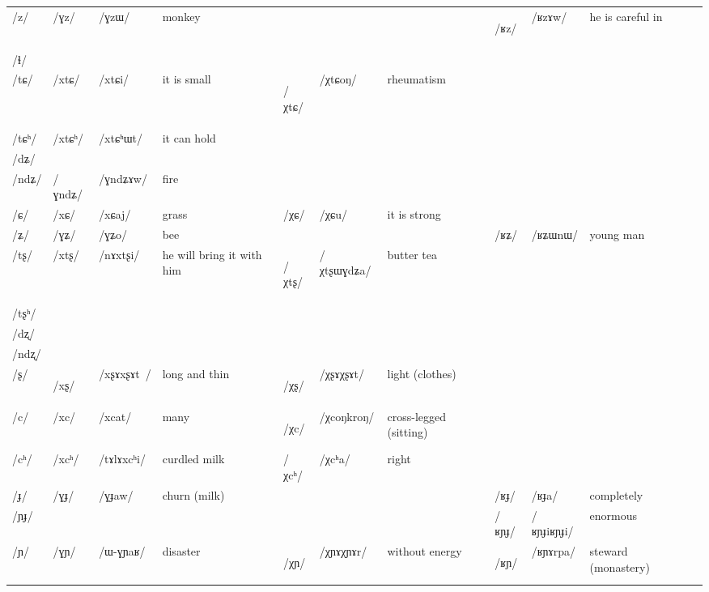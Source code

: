 \documentclass[oneside,a4paper,11pt]{article}
\newcommand{\ipa}[1]{\mbox{\phon/#1/}}
\newcommand{\deux}[1]{\ipa{#1}\addtocounter{2clusters}{1}}
\newcommand{\tib}[1]{\cellcolor{lightgray}\textbf{#1}}
\newcommand{\idph}[1]{\cellcolor{gray}\textbf{#1}}
\begin{document}
\begin{landscape}
\begin{table}
{\begin{tabular}{l|lll|lll|lll|l}
\ipa{z}	& 	 \deux{ɣz}	& 	 \ipa{ɣzɯ}	& 	 monkey 	& 	&	&	& \deux{ʁz}  \tib{}	&   \deux{ʁzɤw} 	& 	he is careful in \\  		
\ipa{ɬ} 	& 	  	& 	  	& 	  	& 	  	& 	  	& 	& 	  	& 	  	& 	 \\  
\ipa{tɕ}	& 	 \deux{xtɕ}	& 	 \ipa{xtɕi}	& 	 it is small 	& 	 \deux{χtɕ}  \tib{} 	& 	 \ipa{χtɕoŋ}	& 	rheumatism	&	&	& \\  	
\ipa{tɕʰ}	& 	 \deux{xtɕʰ}	& 	 \ipa{xtɕʰɯt}	& 	it can hold	& 	  	& 	  	& 	&	&	& \\  		
\ipa{dʑ} 	& 	  	& 	  	& 	  	& 	  	& 	  	& 	& 	  	& 	  	& 	 \\  
\ipa{ndʑ}	& 	 \deux{ɣndʑ}	& 	 \ipa{ɣndʑɤw}	& 	fire	& 	  	& 	  	& 	&	&	&	 \\  	
\ipa{ɕ}	& 	 \deux{xɕ}	& 	 \ipa{xɕaj}	& 	grass	& 	 \deux{χɕ}	& 	 \ipa{χɕu}	& 	it is strong 	&	&	&\\  	
\ipa{ʑ}	& 	 \deux{ɣʑ}	& 	 \ipa{ɣʑo}	& 	bee	& 	&	&	& \ipa{ʁʑ}	&	 \ipa{ʁʑɯnɯ}	& 	young man \\  		
\ipa{tʂ}	& 	 \deux{xtʂ}	& 	 \ipa{nɤxtʂi}	& 	 he will bring it with him 	& 	 \deux{χtʂ}  \tib{}	& 	 \ipa{χtʂɯɣdʑa}	& 	butter tea 	&	&	&\\  	
\ipa{tʂʰ}	& 	  	& 	  	& 	  	& 	  	& 	  	& 	&	&	&	 \\  	
\ipa{dʐ}	& 	  	& 	  	& 	  	& 	  	& 	  	& 	&	&	&	 \\  	
\ipa{ndʐ}	& 	  	& 	  	& 	  	& 	  	& 	  	& 	&	&	&	 \\  	
\ipa{ʂ}	& 	 \deux{xʂ} \idph{}	& 	 \ipa{xʂɤxʂɤt }	& 	long and thin	& 	 \deux{χʂ} \idph{}	& 	 \ipa{χʂɤχʂɤt}	& 	light (clothes)	&	&	& \\  	
\ipa{c}	& 	 \deux{xc}	& 	 \ipa{xcat}	& 	many	& 	 \deux{χc} \tib{}	& 	 \ipa{χcoŋkroŋ}	& 	 cross-legged (sitting) 	&	&	&\\  	
\ipa{cʰ}	& 	 \deux{xcʰ}	& 	 \ipa{tɤlɤxcʰi}	& 	curdled milk	& 	 \deux{χcʰ}	& 	 \ipa{χcʰa}	& 	 right 	&	&	&\\  	
\ipa{ɟ}	& 	 \deux{ɣɟ}	& 	 \ipa{ɣɟaw}	& 	 churn (milk) 	& 	&	&	&	 \deux{ʁɟ}	& 	  \ipa{ʁɟa}	& 	completely  \\  	
\ipa{ɲɟ}	&  	& 	 	& 	 	& 	&	&	&	 \deux{ʁɲɟ}	& 	  \ipa{ʁɲɟiʁɲɟi}	& 	enormous  \\  	
\ipa{ɲ}	& 	 \deux{ɣɲ}	& 	 \ipa{ɯ-ɣɲaʁ}	& 	 disaster 	& 	\deux{χɲ} \idph{}	& \ipa{χɲɤχɲɤr}	& without energy 	& \deux{ʁɲ}\tib{}	& 	 \ipa{ʁɲɤrpa}	& 	steward (monastery) \\  	

\end{tabular}}
\end{table}
\end{landscape}
\end{document}
